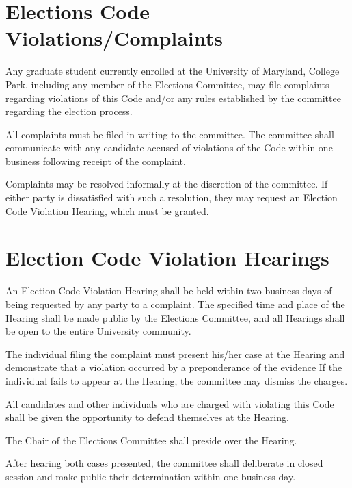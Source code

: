 \section{Elections Code Violations/Complaints}
\begin{bylaws-number}
  \item Any graduate student currently enrolled at the University of Maryland, College Park, including any member of the Elections Committee, may file complaints regarding violations of this Code and/or any rules established by the committee regarding the election process.
  \item All complaints must be filed in writing to the committee. The committee shall communicate with any candidate accused of violations of the Code within one business following receipt of the complaint.
  \item Complaints may be resolved informally at the discretion of the committee. If either party is dissatisfied with such a resolution, they may request an Election Code Violation Hearing, which must be granted.
\end{bylaws-number}

\section{Election Code Violation Hearings}
\begin{bylaws-number}
  \item An Election Code Violation Hearing shall be held within two business days of being requested by any party to a complaint. The specified time and place of the Hearing shall be made public by the Elections Committee, and all Hearings shall be open to the entire University community.
  \item The individual filing the complaint must present his/her case at the Hearing and demonstrate that a violation occurred by a preponderance of the evidence If the individual fails to appear at the Hearing, the committee may dismiss the charges.
  \item All candidates and other individuals who are charged with violating this Code shall be given the opportunity to defend themselves at the Hearing.
  \item The Chair of the Elections Committee shall preside over the Hearing.
  \item After hearing both cases presented, the committee shall deliberate in closed session and make public their determination within one business day.
\end{bylaws-number}

